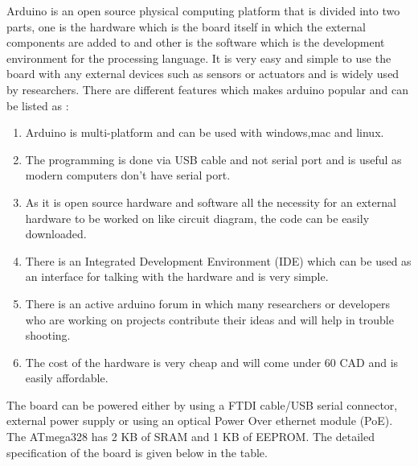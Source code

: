 Arduino is an open source physical computing platform that is divided into two parts, one is the hardware which is the board itself in which the external components are added to and other is the software which is the development environment for the  processing language. It is very easy and simple to use the board with any external devices such as sensors or actuators and is widely used by researchers. There are different features which makes arduino popular and can be listed as \cite{Banzi2008}:


\begin{enumerate}


  \item Arduino is multi-platform and can be used with windows,mac and linux.

  \item The programming is done via USB cable and not serial port and is useful as modern computers don't have serial port.

  \item As it is open source hardware and software all the necessity for an external hardware to be worked on like circuit diagram, the code can be easily downloaded.
  
  \item There is an Integrated Development Environment (IDE) which can be used as an interface for talking with the hardware and is very simple.
  
  \item There is an active arduino forum in which many researchers or developers who are working on projects contribute their ideas and will help in trouble shooting.
  
  \item The cost of the hardware is very cheap and will come under 60 CAD and is easily affordable.
  
\end{enumerate}

The board can be powered either by using a FTDI cable/USB serial connector, external power supply or using an optical Power Over ethernet module (PoE). The ATmega328 has 2 KB of SRAM and 1 KB of EEPROM. The detailed specification\cite{Guti2017} of the board is given below in the table.
 
